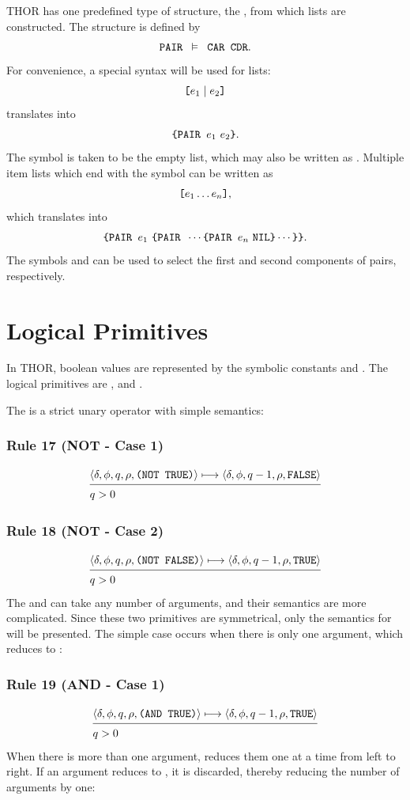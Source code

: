 THOR has one predefined type of structure, the , from which lists are
constructed. The  structure is defined by
\[
\texttt{PAIR }\vDash\texttt{ CAR CDR}.
\]
For convenience, a special syntax will be used for lists:
\[
\texttt{[}e_1\mid e_2\texttt{]}
\]
translates into
\[
\THOR{\{PAIR }e_1\ e_2\THOR{\}}.
\]
The symbol  is taken to be the empty list, which may also be written
as \THOR{[]}. Multiple item lists which end with the symbol  can be
written as
\[
\texttt{[}e_1\ldots e_n\texttt{]},
\]
which translates into
\[
\texttt{\{PAIR }e_1\ \texttt{\{PAIR }\cdots\texttt{\{PAIR }e_n\ \texttt{NIL\}}\cdots\texttt{\}}\texttt{\}}.
\]
The symbols  and
 can be used to select the first and second components of pairs,
respectively.

\section{Logical Primitives}

In THOR, boolean values are represented by the symbolic constants 
and . The logical primitives are ,  and
.

The  is a strict unary operator with simple semantics:

\subsubsection*{Rule 17 (NOT - Case 1)}
\[
\semanticrule{
\cfg{\delta}{\phi}{q}{\rho}{\THOR{(NOT TRUE)}}\redsto
      \cfg{\delta}{\phi}{q-1}{\rho}{\THOR{FALSE}}
}{
q>0
}
\]

\subsubsection*{Rule 18 (NOT - Case 2)}
\[
\semanticrule{
\cfg{\delta}{\phi}{q}{\rho}{\THOR{(NOT FALSE)}}\redsto
      \cfg{\delta}{\phi}{q-1}{\rho}{\THOR{TRUE}}
}{
q>0
}
\]
The  and  can take any number of arguments, and their
semantics are more complicated. Since these two primitives are symmetrical, only
the semantics for  will be presented. The simple case occurs when
there is only one argument, which reduces to :

\subsubsection*{Rule 19 (AND - Case 1)}
\[
\semanticrule{
\cfg{\delta}{\phi}{q}{\rho}{\THOR{(AND TRUE)}}\redsto
      \cfg{\delta}{\phi}{q-1}{\rho}{\THOR{TRUE}}
}{
q>0
}
\]
When there is more than one argument,  reduces them one at a time from
left to right. If an argument reduces to , it is discarded, thereby
reducing the number of arguments by one:

